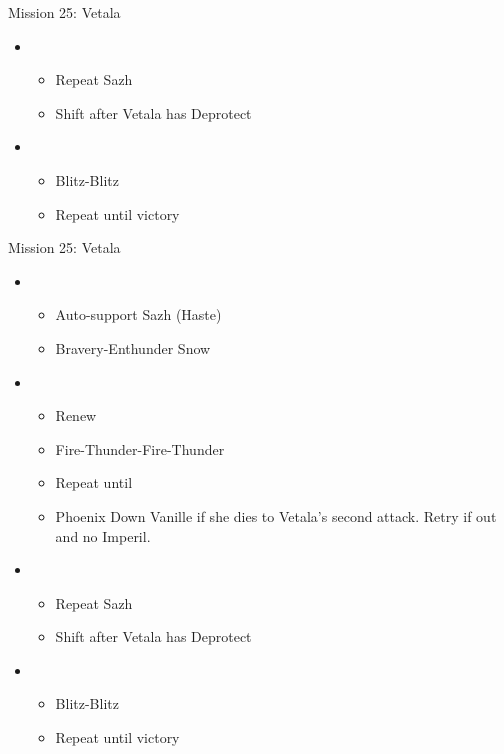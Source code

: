 \begin{paracol}{2}
\begin{battle}{Mission 25: Vetala}
\begin{itemize}
			\item \first
			      \begin{itemize}
				      \item Repeat Sazh
				      \item Shift after Vetala has Deprotect
			      \end{itemize}
			\item \fourth
			      \begin{itemize}
				      \item Blitz-Blitz
				      \item Repeat until victory
			      \end{itemize}
		\end{itemize}
	\end{battle}
	\switchcolumn
	\begin{battle}{Mission 25: Vetala}
		\begin{itemize}
			\item \first
			      \begin{itemize}
				      \item Auto-support Sazh (Haste)
				      \item Bravery-Enthunder Snow
			      \end{itemize}
			\item \fifth
			      \begin{itemize}
				      \item Renew
				      \item Fire-Thunder-Fire-Thunder
				      \item Repeat until \stagger
				      \item Phoenix Down Vanille if she dies to Vetala's second attack. Retry if out and no Imperil.
			      \end{itemize}
			\item \first
			      \begin{itemize}
				      \item Repeat Sazh
				      \item Shift after Vetala has Deprotect
			      \end{itemize}
			\item \second
			      \begin{itemize}
				      \item Blitz-Blitz
				      \item Repeat until victory
			      \end{itemize}
		\end{itemize}

\end{battle}
\end{paracol}
